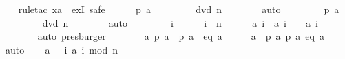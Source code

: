 \begin{isabellebody}
\ \ \isamarkupfalse%
\ {\isacharparenleft}rule{\isacharunderscore}tac\ x{\isacharequal}{\isachardoublequoteopen}{\isacharquery}a{\isachardoublequoteclose}\ \ exI{\isacharcomma}\ safe{\isacharparenright}\isanewline
\ \ \ \ \isamarkupfalse%
\ {\isachardoublequoteopen}{\isacharquery}p{}\ {\isacharquery}a{\isachardoublequoteclose}\isanewline
\ \ \ \ \ \ \isamarkupfalse%
\ {\isacharbackquoteopen}{}\ dvd\ n{\isacharbackquoteclose}\isanewline
\ \ \ \ \ \ \isamarkupfalse%
\ auto\isanewline
\ \ \isamarkupfalse%
\isanewline
\ \ \ \ \isamarkupfalse%
\ {\isachardoublequoteopen}{\isacharquery}p{}\ {\isacharquery}a{\isachardoublequoteclose}\isanewline
\ \ \ \ \ \ \isamarkupfalse%
\ {\isacharbackquoteopen}{}\ dvd\ n{\isacharbackquoteclose}\isanewline
\ \ \ \ \ \ \isamarkupfalse%
\ auto\isanewline
\ \ \isamarkupfalse%
\isanewline
\ \ \ \ \isamarkupfalse%
\ i\isanewline
\ \ \ \ \isamarkupfalse%
\ {\isachardoublequoteopen}i\ {\isacharless}\ n{\isachardoublequoteclose}\isanewline
\ \ \ \ \isamarkupfalse%
\ {\isachardoublequoteopen}{\isacharparenleft}{\isacharquery}a\ i{\isacharparenright}\ {\isacharasterisk}\ {\isacharparenleft}{\isacharquery}a\ {\isacharparenleft}i{\isacharplus}{}{\isacharparenright}{\isacharparenright}\ {\isacharplus}\ {}\ {\isacharequal}\ {\isacharquery}a\ {\isacharparenleft}i{\isacharplus}{}{\isacharparenright}{\isachardoublequoteclose}\isanewline
\ \ \ \ \ \ \isamarkupfalse%
\ auto\ presburger{\isacharplus}\isanewline
\ \ \isamarkupfalse%
\isanewline
{}\isamarkupfalse%
\isanewline
\ \ \isamarkupfalse%
\ {\isachardoublequoteopen}{\isasymexists}\ a{\isachardot}\ {\isacharquery}p{}\ a\ {\isasymand}\ {\isacharquery}p{}\ a\ {\isasymand}\ {\isacharquery}eq\ a{\isachardoublequoteclose}\isanewline
\ \ \isamarkupfalse%
\ \isamarkupfalse%
\ a\ \ {\isachardoublequoteopen}{\isacharquery}p{}\ a{\isachardoublequoteclose}\ {\isachardoublequoteopen}{\isacharquery}p{}\ a{\isachardoublequoteclose}\ {\isachardoublequoteopen}{\isacharquery}eq\ a{\isachardoublequoteclose}\isanewline
\ \ \ \ \isamarkupfalse%
\ auto\isanewline
\isanewline
\isanewline
\ \ \isamarkupfalse%
\ {\isacharquery}a\ {\isacharequal}\ {\isachardoublequoteopen}{\isasymlambda}\ i{\isachardot}\ a\ {\isacharparenleft}i\ mod\ n{\isacharparenright}{\isachardoublequoteclose}\isanewline

\end{isabellebody}
